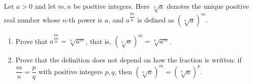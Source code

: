 Let $a>0$ and let $m,n$ be positive integers. Here $\sqrt[n]{a}$ denotes the unique positive real number whose $n$-th power is $a$, and $a^{\dfrac mn}$ is defined as $\left(\sqrt[n]{a}\right)^m$.
\begin{enumerate}
\item[(a)] Prove that $a^{\dfrac mn}=\sqrt[n]{a^m}$, that is, $\left(\sqrt[n]{a}\right)^m=\sqrt[n]{a^m}$.
\item[(b)] Prove that the definition does not depend on how the fraction is written: if $\dfrac mn=\dfrac pq$ with positive integers $p,q$, then $\left(\sqrt[n]{a}\right)^m=\left(\sqrt[q]{a}\right)^p$.
\end{enumerate}
